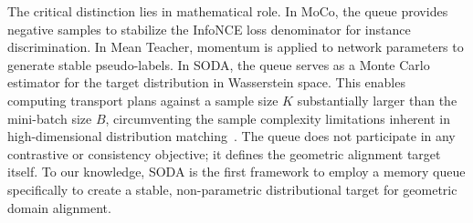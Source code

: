 The critical distinction lies in mathematical role. In MoCo, the queue provides negative samples to stabilize the InfoNCE loss denominator for instance discrimination. In Mean Teacher, momentum is applied to network parameters to generate stable pseudo-labels. In SODA, the queue serves as a Monte Carlo estimator for the target distribution in Wasserstein space. This enables computing transport plans against a sample size $K$ substantially larger than the mini-batch size $B$, circumventing the sample complexity limitations inherent in high-dimensional distribution matching~\citep{dong2020how}. The queue does not participate in any contrastive or consistency objective; it defines the geometric alignment target itself. To our knowledge, SODA is the first framework to employ a memory queue specifically to create a stable, non-parametric distributional target for geometric domain alignment.